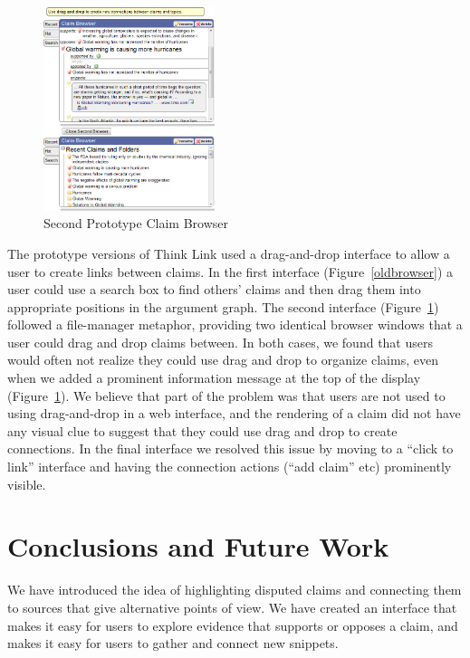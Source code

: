 \documentclass{chi2009}
\begin{document}
\begin{figure}[tb]
\begin{center}
	\includegraphics[width=5cm]{../screenshots/claimbrowse.png}
	\caption{Second Prototype Claim Browser}
	\label{secondbrowser}
\end{center}
\end{figure}

The prototype versions of Think Link used a drag-and-drop interface to allow a user to create links between claims. In the first interface (Figure~\ref{oldbrowser}) a user could use a search box to find others' claims and then drag them into appropriate positions in the argument graph. The second interface (Figure~\ref{secondbrowser}) followed a file-manager metaphor, providing two identical browser windows that a user could drag and drop claims between. 
In both cases, we found that users would often not realize they could use drag and drop to organize claims, even when we added a prominent information message at the top of the display (Figure~\ref{secondbrowser}). We believe that part of the problem was that users are not used to using drag-and-drop in a web interface, and the rendering of a claim did not have any visual clue to suggest that they could use drag and drop to create connections. In the final interface we resolved this issue by moving to a ``click to link'' interface and having the connection actions (``add claim'' etc) prominently visible.

\section{Conclusions and Future Work}

We have introduced the idea of highlighting disputed claims and connecting them to sources that give alternative points of view. We have created an interface that makes it easy for users to explore evidence that supports or opposes a claim, and makes it easy for users to gather and connect new snippets. 
\end{document}
